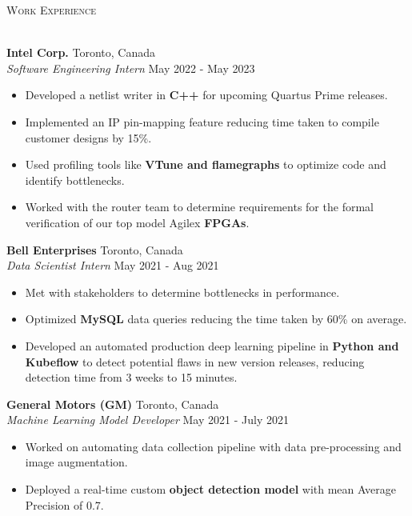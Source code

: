 \documentclass[a4paper]{article}
\newcommand{\lineunder} {
    \vspace*{-8pt} \\
    \hspace*{-18pt} \hrulefill \\
}
\newcommand{\header} [1] {
    {\hspace*{-18pt}\vspace*{6pt} \textsc{#1}}
    \vspace*{-6pt} \lineunder
}
\begin{document}
\header{Work Experience}
\vspace{1mm}

\textbf{Intel Corp.} \hfill Toronto, Canada\\
\textit{Software Engineering Intern} \hfill May 2022 - May 2023\\
\vspace{-3mm}
\begin{itemize} \itemsep 1pt
	\item Developed a netlist writer in \textbf{C++} for upcoming Quartus Prime releases.
	\item Implemented an IP pin-mapping feature reducing time taken to compile customer designs by 15\%.
	\item Used profiling tools like \textbf{VTune and flamegraphs} to optimize code and identify bottlenecks. 
	\item Worked with the router team to determine requirements for the formal verification of our top model Agilex \textbf{FPGAs}. 
\end{itemize}

\textbf{Bell Enterprises} \hfill Toronto, Canada\\
\textit{Data Scientist Intern} \hfill May 2021 - Aug 2021\\
\vspace{-3mm}
\begin{itemize} \itemsep 1pt
	\item Met with stakeholders to determine bottlenecks in performance. 
	\item Optimized \textbf{MySQL} data queries reducing the time taken by 60\% on average.
	\item Developed an automated production deep learning pipeline in \textbf{Python and Kubeflow} to detect potential flaws in new version releases, reducing detection time from 3 weeks to 15 minutes.
\end{itemize}

\textbf{General Motors (GM)} \hfill Toronto, Canada\\
\textit{Machine Learning Model Developer} \hfill May 2021 - July 2021\\
\vspace{-3mm}
\begin{itemize} \itemsep 1pt
	\item Worked on automating data collection pipeline with data pre-processing and image augmentation.
	\item Deployed a real-time custom \textbf{object detection model} with mean Average Precision of 0.7.
\end{itemize}
\end{document}
